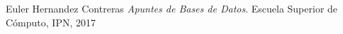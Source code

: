 \documentclass[12pt, fleqn]{report}                             %
\theoremstyle{break}                                            %
\begin{document}

\begin{thebibliography}{10}

        Euler Hernandez Contreras
        \textit{Apuntes de Bases de Datos}. 
        Escuela Superior de Cómputo, IPN, 2017

\end{thebibliography}
\end{document}
